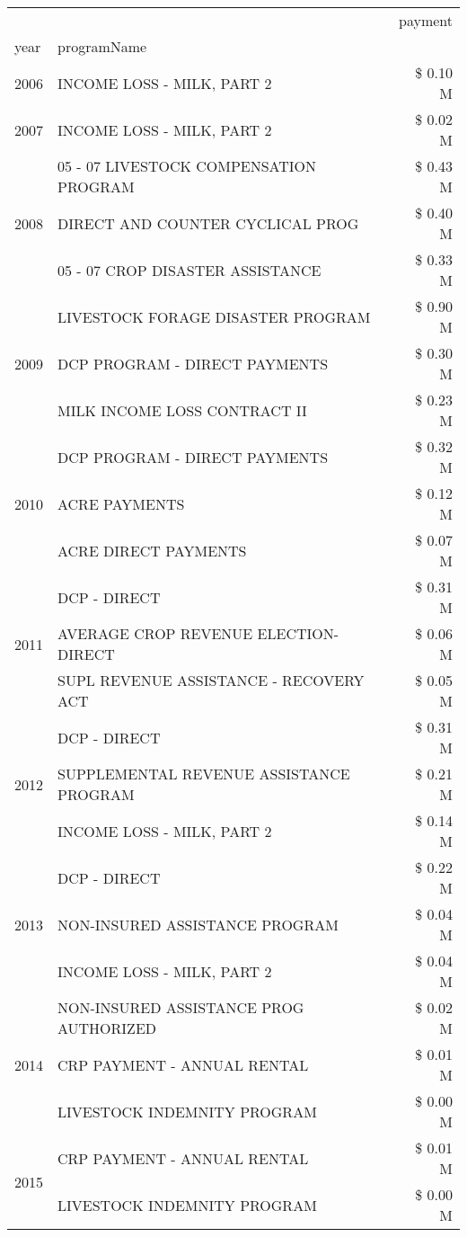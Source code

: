 \begin{tabular}{llr}
\toprule
 &  & payment \\
year & programName &  \\
\midrule
2006 & INCOME LOSS - MILK, PART 2 & \$ 0.10 M \\
\cline{1-3}
2007 & INCOME LOSS - MILK, PART 2 & \$ 0.02 M \\
\cline{1-3}
\multirow[t]{3}{*}{2008} & 05 - 07 LIVESTOCK COMPENSATION PROGRAM & \$ 0.43 M \\
 & DIRECT AND COUNTER CYCLICAL PROG & \$ 0.40 M \\
 & 05 - 07 CROP DISASTER ASSISTANCE & \$ 0.33 M \\
\cline{1-3}
\multirow[t]{3}{*}{2009} & LIVESTOCK FORAGE DISASTER  PROGRAM & \$ 0.90 M \\
 & DCP PROGRAM - DIRECT PAYMENTS & \$ 0.30 M \\
 & MILK INCOME LOSS CONTRACT II & \$ 0.23 M \\
\cline{1-3}
\multirow[t]{3}{*}{2010} & DCP PROGRAM - DIRECT PAYMENTS & \$ 0.32 M \\
 & ACRE PAYMENTS & \$ 0.12 M \\
 & ACRE DIRECT PAYMENTS & \$ 0.07 M \\
\cline{1-3}
\multirow[t]{3}{*}{2011} & DCP - DIRECT & \$ 0.31 M \\
 & AVERAGE CROP REVENUE ELECTION-DIRECT & \$ 0.06 M \\
 & SUPL REVENUE ASSISTANCE - RECOVERY ACT & \$ 0.05 M \\
\cline{1-3}
\multirow[t]{3}{*}{2012} & DCP - DIRECT & \$ 0.31 M \\
 & SUPPLEMENTAL REVENUE ASSISTANCE PROGRAM & \$ 0.21 M \\
 & INCOME LOSS - MILK, PART 2 & \$ 0.14 M \\
\cline{1-3}
\multirow[t]{3}{*}{2013} & DCP - DIRECT & \$ 0.22 M \\
 & NON-INSURED ASSISTANCE PROGRAM & \$ 0.04 M \\
 & INCOME LOSS - MILK, PART 2 & \$ 0.04 M \\
\cline{1-3}
\multirow[t]{3}{*}{2014} & NON-INSURED ASSISTANCE PROG AUTHORIZED & \$ 0.02 M \\
 & CRP PAYMENT - ANNUAL RENTAL & \$ 0.01 M \\
 & LIVESTOCK INDEMNITY PROGRAM & \$ 0.00 M \\
\cline{1-3}
\multirow[t]{3}{*}{2015} & CRP PAYMENT - ANNUAL RENTAL & \$ 0.01 M \\
 & LIVESTOCK INDEMNITY PROGRAM & \$ 0.00 M \\

\end{tabular}
